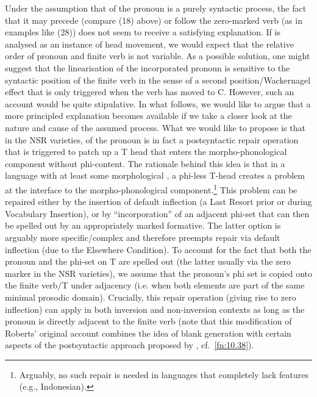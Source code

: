 \documentclass[output=paper]{langsci/langscibook}
\begin{document}
Under the assumption that  of the pronoun is a purely syntactic
process, the fact that it may precede (compare (18) above) or follow the
zero-marked verb (as in examples like (28)) does not seem to receive a
satisfying explanation. If  is analysed as an instance of head
movement, we would expect that the relative order of pronoun and finite verb is
not variable. As a possible solution, one might suggest that the linearisation
of the incorporated pronoun is sensitive to the syntactic position of the
finite verb in the sense of a second position/Wackernagel effect that is only
triggered when the verb has moved to C. However, such an account would
be quite stipulative. In what follows, we would like to argue that a more
principled explanation becomes available  if we take a closer look at the
nature and cause of the assumed  process. What we would like to
propose is that in the \gls{NSR} varieties,  of the pronoun is in
fact a postsyntactic repair operation that is triggered to patch up a T head
that enters the morpho-phonological component without phi-content. The
rationale behind this idea is that in a language with at least some
morphological , a phi-less T-head creates a problem at the interface
to the morpho-phonological component.\footnote{Arguably, no such repair is
    needed in languages that completely lack  features (e.g.,
Indonesian).} This problem can be repaired either by the insertion of default
inflection (a Last Resort prior or during Vocabulary Insertion), or by
``incorporation'' of an adjacent phi-set that can then be spelled out by an
appropriately marked  formative. The latter option is arguably more
specific/complex and therefore preempts repair via default inflection (due to
the Elsewhere Condition). To account for the fact that both the pronoun and the
phi-set on T are spelled out (the latter usually via the zero marker in the
\gls{NSR} varieties), we assume that the pronoun's phi set is copied onto the
finite verb/T under adjacency (i.e. when both elements are part of the same
minimal prosodic domain). Crucially, this repair operation (giving rise to zero
inflection) can apply in both inversion and non-inversion contexts as long as
the pronoun is directly adjacent to the finite verb (note that this
modification of Roberts' original account combines the idea of blank generation
with certain aspects of the postsyntactic approach proposed by
\citealt{TripsFuss:2010}, cf.~\cref{fn:10.38}).
\end{document}
